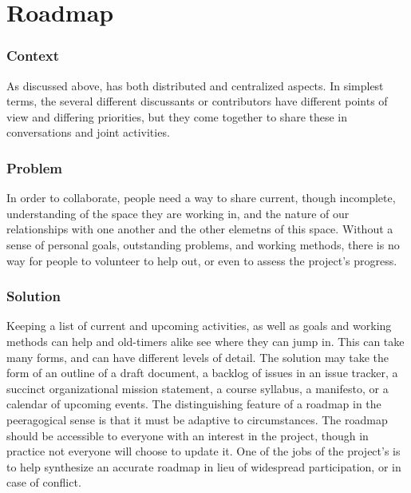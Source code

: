 \begingroup \color{OliveGreen}

\section{Roadmap} \label{sec:Roadmap}



\subsubsection*{Context} As discussed above,  has both distributed and centralized aspects. In simplest terms, the several different discussants or contributors have different points of view and differing priorities, but they come together to share these in conversations and joint activities.

\subsubsection*{Problem} In order to collaborate, people need a way to share current, though incomplete, understanding of the space they are working in, and the nature of our relationships with one another and the other elemetns of this space.  Without a sense of personal goals, outstanding problems, and working methods, there is no way for people to volunteer to help out, or even to assess the project's progress.  

\subsubsection*{Solution} Keeping a list of current and upcoming activities, as well as goals and working methods can help  and old-timers alike see where they can jump in.  This can take many forms, and can have different levels of detail.  The solution may take the form of an outline of a draft document, a backlog of issues in an issue tracker, a succinct organizational mission statement, a course syllabus, a manifesto, or a calendar of upcoming events.  The distinguishing feature of a roadmap in the peeragogical sense is that it must be adaptive to circumstances.  The roadmap should be accessible to everyone with an interest in the project, though in practice not everyone will choose to update it.  One of the jobs of the project's  is to help synthesize an accurate roadmap in lieu of widespread participation, or in case of conflict.

